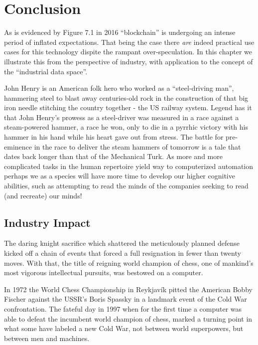 \chapter{Conclusion\label{cha:chapter8}}

As is evidenced by Figure 7.1 in 2016 ``blockchain'' is undergoing an intense period of inflated expectations. 
That being the case there \textit{are} indeed practical use cases for this technology dispite the rampant over-speculation.
In this chapter we illustrate this from the perspective of industry, with application to the concept of the ``industrial data space''. 

John Henry is an American folk hero who worked as a ``steel-driving man'', hammering steel to blast away centuries-old rock in the construction of that big iron needle stitching the country together - the US railway system. Legend has it that John Henry's prowess as a steel-driver was measured in a race against a steam-powered hammer, a race he won, only to die in a pyrrhic victory with his hammer in his hand while his heart gave out from stress.
The battle for pre-eminence in the race to deliver the steam hammers of tomorrow is a tale that dates back longer than that of the Mechanical Turk. 
As more and more complicated tasks in the human repertoire yield way to computerized automation perhaps we as a species will have more time to develop our higher cognitive abilities, such as attempting to read the minds of the companies seeking to read (and recreate) our minds!

\section{Industry Impact}

The daring knight sacrifice which shattered the meticulously planned defense kicked off a chain of events that forced a full resignation in fewer than twenty moves. With that, the title of reigning world champion of chess, one of mankind's most vigorous intellectual pursuits, was bestowed on a computer.

In 1972 the World Chess Championship in Reykjav{\'i}k pitted the American Bobby Fischer against the USSR's Boris Spassky in a landmark event of the Cold War confrontation. The fateful day in 1997 when for the first time a computer was able to defeat the incumbent world champion of chess, marked a turning point in what some have labeled a new Cold War, not between world superpowers, but between men and machines.

